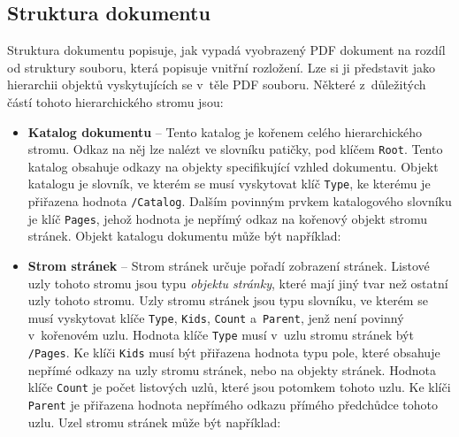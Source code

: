 \begin{itemize}
\end{itemize}



\subsection*{Struktura dokumentu} \label{document_structure}
Struktura dokumentu popisuje, jak vypadá vyobrazený PDF dokument na rozdíl
od struktury souboru, která popisuje vnitřní rozložení.
Lze si ji představit jako hierarchii objektů vyskytujících se v~těle PDF souboru.
Některé z~důležitých částí tohoto hierarchického stromu jsou:
\begin{itemize}
    \item \textbf{Katalog dokumentu} -- Tento katalog je kořenem celého
    hierarchického stromu. Odkaz na něj lze nalézt ve slovníku patičky, pod klíčem
    \texttt{Root}. Tento katalog obsahuje odkazy na objekty specifikující vzhled
    dokumentu. Objekt katalogu je slovník, ve kterém se musí vyskytovat klíč
    \texttt{Type}, ke kterému je přiřazena hodnota \texttt{/Catalog}. Dalším
    povinným prvkem katalogového slovníku je klíč \texttt{Pages}, jehož hodnota je
    nepřímý odkaz na kořenový objekt stromu stránek. Objekt katalogu dokumentu
    může být například:

    \item \textbf{Strom stránek} -- Strom stránek určuje pořadí zobrazení stránek.
    Listové uzly tohoto stromu jsou typu \emph{objektu stránky}, které mají jiný
    tvar než ostatní uzly tohoto stromu. Uzly stromu stránek jsou typu slovníku,
    ve kterém se musí vyskytovat klíče \texttt{Type}, \texttt{Kids},
    \texttt{Count} a~\texttt{Parent}, jenž není povinný v~kořenovém uzlu.
    Hodnota klíče \texttt{Type} musí v~uzlu stromu stránek být \texttt{/Pages}.
    Ke klíči \texttt{Kids} musí být přiřazena hodnota typu pole, které obsahuje
    nepřímé odkazy na uzly stromu stránek, nebo na objekty stránek. Hodnota klíče
    \texttt{Count} je počet listových uzlů, které jsou potomkem tohoto uzlu. Ke
    klíči \texttt{Parent} je přiřazena hodnota nepřímého odkazu přímého předchůdce
    tohoto uzlu. Uzel stromu stránek může být například:


\end{itemize}
